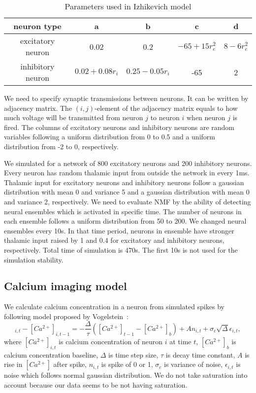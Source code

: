\begin{table}[htb]
  \center
  \begin{tabular}{|c|cccc|} \hline
    neuron type & a & b & c & d \\ \hline
    excitatory neuron & 0.02 & 0.2 & $-65 + 15 r_e^2$ & $8 - 6r_e^2$ \\
    inhibitory neuron & $0.02 + 0.08r_i$ & $0.25 - 0.05 r_i$ & -65 & 2 \\ \hline
  \end{tabular}
  \caption{Parameters used in Izhikevich model}
  \label{tab:parameter1}
\end{table}

We need to specify synaptic transmissions between neurons.
It can be written by adjacency matrix.
The $(i,j)$-element of the adjacency matrix equals to how much voltage will be transmitted from neuron $j$ to neuron $i$ when neuron $j$ is fired.
The columns of excitatory neurons and inhibitory neurons are random variables following a uniform distribution from 0 to 0.5 and a uniform distribution from -2 to 0, respectively.

We simulated for a network of 800 excitatory neurons and 200 inhibitory neurons.
Every neuron has random thalamic input from outside the network in every 1ms.
Thalamic input for excitatory neurons and inhibitory neurons follow a gaussian distribution with mean 0 and variance 5 and a gaussian distribution with mean 0 and variance 2, respectively.
We need to evaluate NMF by the ability of detecting neural ensembles which is activated in specific time.
The number of neurons in each ensemble follows a uniform distribution from 50 to 200.
We changed neural ensembles every 10s.
In that time period, neurons in ensemble have stronger thalamic input raised by 1 and 0.4 for excitatory and inhibitory neurons, respectively.
Total time of simulation is 470s.
The first 10s is not used for the simulation stability.

\subsection{Calcium imaging model}
We calculate calcium concentration in a neuron from simulated spikes by following model proposed by Vogelstein~\cite{Vogelstein2009}:
\begin{equation}
  [Ca^{2+}]_{i,t} - [Ca^{2+}]_{i,t-1} = - \frac{\Delta}{\tau}([Ca^{2+}]_{t-1} - [Ca^{2+}]_b) + An_{i,t} + \sigma_c \sqrt{\Delta} \epsilon_{i,t},
  \label{eq:calcium}
\end{equation}
where $[Ca^{2+}]_{i,t}$ is calcium concentration of neuron $i$ at time $t$, $[Ca^{2+}]_b$ is calcium concentration baseline, $\Delta$ is time step size, $\tau$ is decay time constant, $A$ is rise in $[Ca^{2+}]$ after spike, $n_{i,t}$ is spike of 0 or 1, $\sigma_c$ is variance of noise, $\epsilon_{i,t}$ is noise which follows normal gaussian distribution.
We do not take saturation into account because our data seems to be not having saturation.

